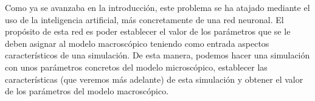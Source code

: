 Como ya se avanzaba en la introducción, este problema se ha atajado mediante el uso de la inteligencia artificial, más concretamente de una red neuronal. El propósito de esta red es poder establecer el valor de los parámetros que se le deben asignar al modelo macroscópico teniendo como entrada aspectos característicos de una simulación. De esta manera, podemos hacer una simulación con unos parámetros concretos del modelo microscópico, establecer las características (que veremos más adelante) de esta simulación y obtener el valor de los parámetros del modelo macroscópico.






















